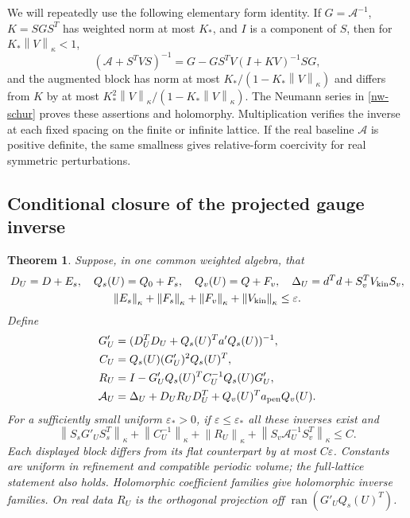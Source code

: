\documentclass[11pt]{article}
\newtheorem{theorem}{Theorem}[section]
\theoremstyle{remark}
\newcommand{\norm}[1]{\left\|#1\right\|}
\begin{document}
We will repeatedly use the following elementary form identity.
If $G=\mathcal A^{-1}$, $K=SGS^T$ has weighted norm at most $K_*$,
and $I$ is a component of $S$, then for $K_*\norm{V}_\kappa<1$,
\begin{equation}\label{nw-form-resolvent}
 (\mathcal A+S^TVS)^{-1}
 =G-GS^TV(I+KV)^{-1}SG,
\end{equation}
and the augmented block has norm at most
$K_* /(1-K_*\norm{V}_\kappa)$ and differs from $K$ by at most
$K_*^2\norm{V}_\kappa/(1-K_*\norm{V}_\kappa)$.
The Neumann series in \eqref{nw-schur} proves these assertions and
holomorphy. Multiplication verifies the inverse at each fixed
spacing on the finite or infinite lattice. If the real baseline
$\mathcal A$ is positive definite, the same smallness gives
relative-form coercivity for real symmetric perturbations.

\subsection{Conditional closure of the projected gauge inverse}
\label{nw-conditional}

\begin{theorem}\label{nw-energy-theorem}
Suppose, in one common weighted algebra, that
\begin{gather}
 D_U=D+E_s,\quad Q_s(U)=Q_0+F_s,\quad Q_v(U)=Q+F_v,
 \quad \Delta_U=d^Td+S_v^TV_{\rm kin}S_v,\nonumber\\
 \norm{E_s}_\kappa+\norm{F_s}_\kappa+
 \norm{F_v}_\kappa+\norm{V_{\rm kin}}_\kappa\le\varepsilon.
                                                        \label{nw-hypotheses}
\end{gather}
Define
\begin{align}
 G'_U&=(D_U^TD_U+Q_s(U)^Ta'Q_s(U))^{-1},\nonumber\\
 C_U&=Q_s(U)(G'_U)^2Q_s(U)^T,\nonumber\\
 R_U&=I-G'_UQ_s(U)^TC_U^{-1}Q_s(U)G'_U,\nonumber\\
 \mathcal A_U&=\Delta_U+D_UR_UD_U^T
                     +Q_v(U)^Ta_{\rm pen}Q_v(U).       \label{nw-full-operator}
\end{align}
For a sufficiently small uniform $\varepsilon_*>0$, if
$\varepsilon\le\varepsilon_*$ all these inverses exist and
\begin{equation}\label{nw-energy-bound}
 \norm{S_sG'_US_s^T}_\kappa+
 \norm{C_U^{-1}}_\kappa+\norm{R_U}_\kappa+
 \norm{S_v\mathcal A_U^{-1}S_v^T}_\kappa\le C.
\end{equation}
Each displayed block differs from its flat counterpart by at
most $C\varepsilon$. Constants are uniform in refinement and
compatible periodic volume; the full-lattice statement also holds.
Holomorphic coefficient families give holomorphic inverse families.
On real data $R_U$ is the orthogonal projection off
$\operatorname{ran}(G'_UQ_s(U)^T)$.
\end{theorem}
\end{document}
